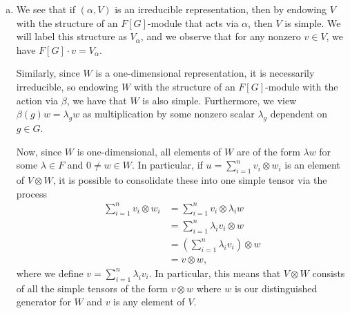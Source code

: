 \documentclass[10pt]{mypackage}
\begin{document}
\begin{solution}
\begin{enumerate}[(a)]
      In particular, if $\left( \alpha,V \right)$ not irreducible, then there is some subspace $V'\leq V$ with $V'$ invariant under $\alpha$. For any simple tensor $v\otimes w\in V'\otimes W$, we have
      \begin{align*}
        \rho\left( g \right)\left( v\otimes w \right) &= \alpha(g)v \otimes \beta(g)w\\
                                                      &\in V'\otimes W,
      \end{align*}
      meaning that $V'\otimes W$ is invariant under the action of $\rho$ on simple tensors, so it is invariant under the action of $\rho$ on all tensors, meaning $V'\otimes W\leq V\otimes W$ is a subrepresentation.
    \item We see that if $\left( \alpha,V \right)$ is an irreducible representation, then by endowing $V$ with the structure of an $F[G]$-module that acts via $\alpha$, then $V$ is simple. We will label this structure as $V_{\alpha}$, and we observe that for any nonzero $v\in V$, we have $F[G]\cdot v = V_{\alpha}$. 

      Similarly, since $W$ is a one-dimensional representation, it is necessarily irreducible, so endowing $W$ with the structure of an $F[G]$-module with the action via $\beta$, we have that $W$ is also simple. Furthermore, we view $\beta(g)w = \lambda_g w$ as multiplication by some nonzero scalar $\lambda_g$ dependent on $g\in G$.

      Now, since $W$ is one-dimensional, all elements of $W$ are of the form $\lambda w$ for some $\lambda\in F$ and $0\neq w\in W$. In particular, if $u = \sum_{i=1}^{n}v_i\otimes w_i$ is an element of $V\otimes W$, it is possible to consolidate these into one simple tensor via the process
      \begin{align*}
        \sum_{i=1}^{n}v_i\otimes w_i &= \sum_{i=1}^{n}v_i\otimes \lambda_i w\\
                                     &= \sum_{i=1}^{n}\lambda_iv_i\otimes w\\
                                     &= \left( \sum_{i=1}^{n}\lambda_iv_i \right)\otimes w\\
                                     &= v\otimes w,
      \end{align*}
      where we define $v = \sum_{i=1}^{n}\lambda_iv_i$. In particular, this means that $V\otimes W$ consists of all the simple tensors of the form $v\otimes w$ where $w$ is our distinguished generator for $W$ and $v$ is any element of $V$.


\end{enumerate}
\end{solution}
\end{document}
